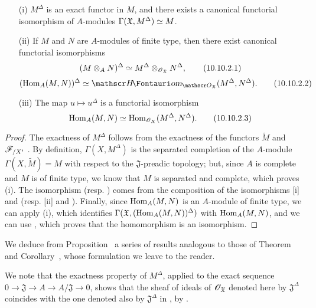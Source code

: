 \begin{proposition}[10.10.2]
\label{1.10.10.2}
\medskip\noindent
\begin{enumerate}
  \item[\rm{(i)}] $M^\Delta$ is an exact functor in $M$, and there exists a canonical functorial isomorphism of $A$-modules $\Gamma(\mathfrak{X},M^\Delta)\simeq M$.
  \item[\rm{(ii)}] If $M$ and $N$ are $A$-modules of finite type, then there exist canonical functorial isomorphisms
    \[
    \label{1.10.10.2.1}
      (M\otimes_A N)^\Delta\simeq M^\Delta\otimes_{\mathscr{O}_\mathfrak{X}}N^\Delta,
      \tag{10.10.2.1}
    \]
    \[
    \label{1.10.10.2.2}
      (\Hom_A(M,N))^\Delta\isoto\shHom_{\sh{O}_\mathfrak{X}}(M^\Delta,N^\Delta).
      \tag{10.10.2.2}
    \]
  \item[\rm{(iii)}] The map $u\mapsto u^\Delta$ is a functorial isomorphism
    \[
    \label{1.10.10.2.3}
      \operatorname{Hom}_A(M,N)\simeq\operatorname{Hom}_{\mathscr{O}_X}(M^\Delta,N^\Delta).
      \tag{10.10.2.3}
    \]
\end{enumerate}
\end{proposition}

\begin{proof}
\label{proof-1.10.10.2}
The exactness of $M^\Delta$ follows from the exactness of the functors $\widetilde{M}$  and $\mathscr{F}_{/X'}$ .
By definition, $\Gamma(X,M^\Delta)$ is the separated completion of the $A$-module $\Gamma(X,\widetilde{M})=M$ with respect to the $\mathfrak{J}$-preadic topology; but, since $A$ is complete and $M$ is of finite type, we know  that $M$ is separated and complete, which proves (i).
The isomorphism  (resp. ) comes from the composition of the isomorphisms [i] and  (resp. [ii] and ).
Finally, since $\operatorname{Hom}_A(M,N)$ is an $A$-module of finite type, we can apply (i), which identifies $\Gamma(\mathfrak{X},(\operatorname{Hom}_A(M,N))^\Delta)$ with $\operatorname{Hom}_A(M,N)$, and we can use , which proves that the homomorphism  is an isomorphism.
\end{proof}

We deduce from Proposition~ a series of results analogous to those of Theorem~ and Corollary~, whose formulation we leave to the reader.

We note that the exactness property of $M^\Delta$, applied to the exact sequence $0\to\mathfrak{J}\to A\to A/\mathfrak{J}\to 0$, shows that the sheaf of ideals of $\mathscr{O}_\mathfrak{X}$ denoted here by $\mathfrak{J}^\Delta$ coincides with the one denoted also by $\mathfrak{J}^\Delta$ in , by .


